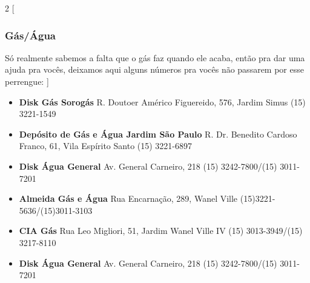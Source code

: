 \begin{multicols}{2}
  [
  \subsubsection{Gás/Água}
    Só realmente sabemos a falta que o gás faz quando ele acaba, então pra dar uma ajuda pra vocês, deixamos aqui alguns números pra vocês não passarem por esse perrengue:
  ]
  \begin{itemize}
    \item \textbf{Disk Gás Sorogás}
      \newline R. Doutoer Américo Figuereido, 576, Jardim Simus
      \newline (15) 3221-1549
  \end{itemize}
  \begin{itemize}
    \item \textbf{Depósito de Gás e Água Jardim São Paulo}
      \newline R. Dr. Benedito Cardoso Franco, 61, Vila Espírito Santo
      \newline (15) 3221-6897
  \end{itemize}
  \begin{itemize}
    \item \textbf{Disk Água General}
      \newline Av. General Carneiro, 218
      \newline (15) 3242-7800/(15) 3011-7201
  \end{itemize}
  \begin{itemize}
    \item \textbf{Almeida Gás e Água}
      \newline Rua Encarnação, 289, Wanel Ville
      \newline (15)3221-5636/(15)3011-3103
  \end{itemize}
  \begin{itemize}
    \item \textbf{CIA Gás}
      \newline Rua Leo Migliori, 51, Jardim Wanel Ville IV
      \newline (15) 3013-3949/(15) 3217-8110
  \end{itemize}
  \begin{itemize}
    \item \textbf{Disk Água General}
      \newline Av. General Carneiro, 218
      \newline (15) 3242-7800/(15) 3011-7201
  \end{itemize}
\end{multicols}

